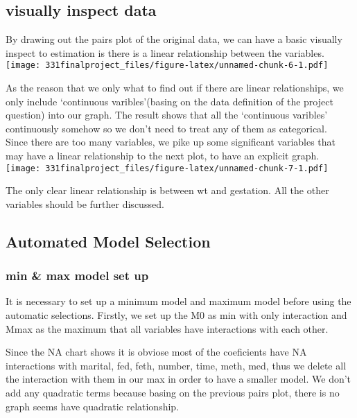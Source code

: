 \documentclass[]{article}
\begin{document}
\subsection{visually inspect data}

By drawing out the pairs plot of the original data, we can have a basic
visually inspect to estimation is there is a linear relationship between
the variables.\\
\texttt{[image: 331finalproject\_files/figure-latex/unnamed-chunk-6-1.pdf]}

As the reason that we only what to find out if there are linear
relationships, we only include `continuous varibles'(basing on the data
definition of the project question) into our graph. The result shows
that all the `continuous varibles' continuously somehow so we don't need
to treat any of them as categorical.\\
Since there are too many variables, we pike up some significant
variables that may have a linear relationship to the next plot, to have
an explicit graph.\\
\texttt{[image: 331finalproject\_files/figure-latex/unnamed-chunk-7-1.pdf]}

The only clear linear relationship is between wt and gestation. All the
other variables should be further discussed.

\subsection{Automated Model Selection}

\subsubsection{min \& max model set up}\label{min-max-model-set-up}

It is necessary to set up a minimum model and maximum model before using
the automatic selections. Firstly, we set up the M0 as min with only
interaction and Mmax as the maximum that all variables have interactions
with each other.

Since the NA chart shows it is obviose most of the coeficients have NA
interactions with marital, fed, feth, number, time, meth, med, thus we
delete all the interaction with them in our max in order to have a
smaller model. We don't add any quadratic terms because basing on the
previous pairs plot, there is no graph seems have quadratic
relationship.
\end{document}
